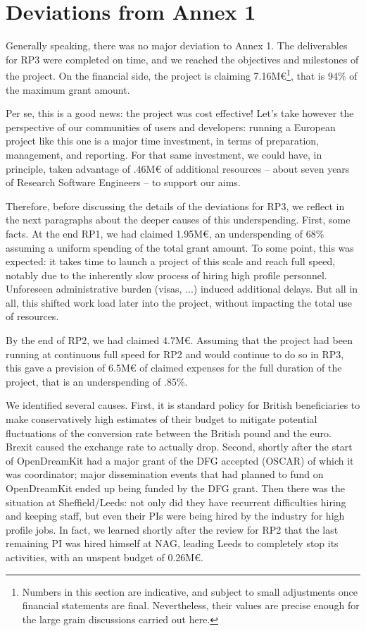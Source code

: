 \section{Deviations from Annex 1}
\label{section.deviations}

Generally speaking, there was no major deviation to Annex 1. The
deliverables for RP3 were completed on time, and we reached the
objectives and milestones of the project. On the financial side, the
project is claiming 7.16M€\footnote{Numbers in this section are
  indicative, and subject to small adjustments once financial
  statements are final. Nevertheless, their values are precise enough
  for the large grain discussions carried out here.}, that is 94\% of
the maximum grant amount.

Per se, this is a good news: the project was cost effective! Let's
take however the perspective of our communities of users and
developers: running a European project like this one is a major time
investment, in terms of preparation, management, and reporting. For
that same investment, we could have, in principle, taken advantage of
.46M€ of additional resources -- about seven years of Research
Software Engineers -- to support our aims.

Therefore, before discussing the details of the deviations for RP3, we
reflect in the next paragraphs about the deeper causes of this
underspending. First, some facts. At the end RP1, we had claimed
1.95M€, an underspending of 68\% assuming a uniform spending of the
total grant amount. To some point, this was expected: it takes time to
launch a project of this scale and reach full speed, notably due to
the inherently slow process of hiring high profile personnel.
Unforeseen administrative burden (visas, ...) induced additional
delays. But all in all, this shifted work load later into the project,
without impacting the total use of resources.

By the end of RP2, we had claimed 4.7M€. Assuming that the project had
been running at continuous full speed for RP2 and would continue to do
so in RP3, this gave a prevision of 6.5M€ of claimed expenses for the
full duration of the project, that is an underspending of .85\%.

We identified several causes. First, it is standard policy for British
beneficiaries to make conservatively high estimates of their budget to
mitigate potential fluctuations of the conversion rate between the
British pound and the euro. Brexit caused the exchange rate to
actually drop. Second, shortly after the start of OpenDreamKit
 had a major grant of the DFG accepted (OSCAR) of which it
was coordinator; major dissemination events that  had planned
to fund on OpenDreamKit ended up being funded by the DFG grant. Then
there was the situation at Sheffield/Leeds: not only did they have
recurrent difficulties hiring and keeping staff, but even their PIs
were being hired by the industry for high profile jobs. In fact, we
learned shortly after the review for RP2 that the last remaining PI
was hired himself at NAG, leading Leeds to completely stop its
activities, with an unspent budget of 0.26M€.


